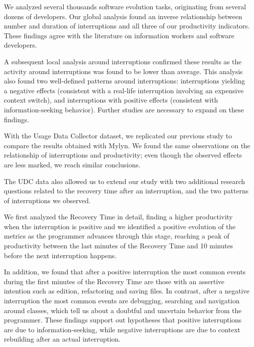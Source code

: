 \documentclass[times]{smrauth}
\begin{document}
We analyzed several thousands software evolution tasks, originating from several dozens of developers. Our global analysis found an inverse relationship between number and duration of interruptions and all three of our productivity indicators. These findings agree with the literature on information workers and software developers. 

A subsequent local analysis around interruptions confirmed these results as the activity around interruptions was found to be lower than average. This analysis also found two well-defined patterns around interruptions: interruptions yielding a negative effects (consistent with a real-life interruption involving an expensive context switch), and interruptions with positive effects (consistent with information-seeking behavior). Further studies are necessary to expand on these findings.

With the Usage Data Collector dataset, we replicated our previous study to compare the results obtained with Mylyn. We found the same observations on the relationship of interruptions and productivity; even though the observed effects are less marked, we reach similar conclusions.

The UDC data also allowed us to extend our study with two additional research questions related to the recovery time after an interruption, and the two patterns of interruptions we observed. 

We first analyzed the Recovery Time in detail, finding a higher productivity when the interruption is positive and we identified a positive evolution of the metrics as the programmer advances through this stage, reaching a peak of productivity between the last minutes of the Recovery Time and 10 minutes before the next interruption happens.  

In addition, we found that after a positive interruption the most common events during the first minutes of the Recovery Time are those with an assertive intention such as edition, refactoring and saving files. In contrast, after a negative interruption the most common events are debugging, searching and navigation around classes, which tell us about a doubtful and uncertain behavior from the programmer. These findings support out hypotheses that positive interruptions are due to information-seeking, while negative interruptions are due to context rebuilding after an actual interruption.





\end{document}
